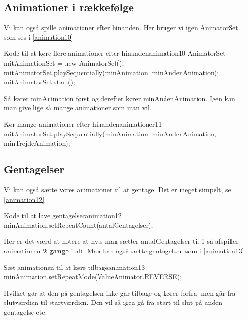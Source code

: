 \subsection{Animationer i rækkefølge}
Vi kan også spille animationer efter hinanden. Her bruger vi igen AnimatorSet som ses i \autoref{animation10}
\begin{JavaCode}{Kode til at køre flere animationer efter hinanden}{animation10}
	AnimatorSet mitAnimationSet = new AnimatorSet();
	mitAnimatorSet.playSequentially(minAnimation, minAndenAnimation);
	mitAnimatorSet.start();
\end{JavaCode}
Så kører minAnimation først og derefter kører minAndenAnimation. Igen kan man give lige så mange animationer som man vil. 
\begin{JavaCode}{Kør mange animationer efter hinanden}{animationer11}
	mitAnimatorSet.playSequentially(minAnimation, minAndenAnimation, minTrejdeAnimation);
\end{JavaCode}
\subsection{Gentagelser}
Vi kan også sætte vores animationer til at gentage. Det er meget simpelt, se \autoref{animation12}
\begin{JavaCode}{Kode til at lave gentagelser}{animation12}
	minAnimation.setRepeatCount(antalGentagelser);
\end{JavaCode}
Her er det værd at notere at hvis man sætter antalGentagelser til 1 så afspiller animationen \textbf{2 gange} i alt.
Man kan også sætte gentagelsen som i \autoref{animation13}
\begin{JavaCode}{Sæt animationen til at køre tilbage}{animation13}
	minAnimation.setRepeatMode(ValueAnimator.REVERSE);
\end{JavaCode}
Hvilket gør at den på gentagelsen ikke går tilbage og kører forfra, men går fra slutværdien til startværdien. Den vil så igen gå fra start til slut på anden gentagelse etc.


